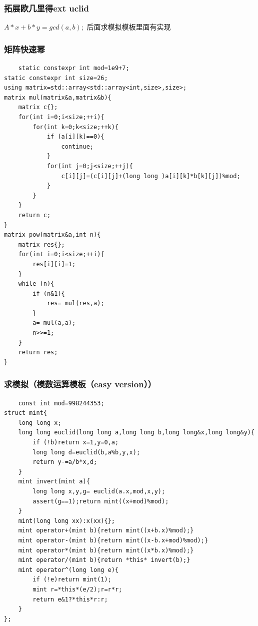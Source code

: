 \documentclass[UTF8,twoside]{ctexart}
\begin{document}
\subsubsection{拓展欧几里得ext uclid}
$A*x+b*y=gcd(a,b);$
后面求模拟模板里面有实现
\subsubsection{矩阵快速幂}
\begin{lstlisting}
    static constexpr int mod=1e9+7;
static constexpr int size=26;
using matrix=std::array<std::array<int,size>,size>;
matrix mul(matrix&a,matrix&b){
    matrix c{};
    for(int i=0;i<size;++i){
        for(int k=0;k<size;++k){
            if (a[i][k]==0){
                continue;
            }
            for(int j=0;j<size;++j){
                c[i][j]=(c[i][j]+(long long )a[i][k]*b[k][j])%mod;
            }
        }
    }
    return c;
}
matrix pow(matrix&a,int n){
    matrix res{};
    for(int i=0;i<size;++i){
        res[i][i]=1;
    }
    while (n){
        if (n&1){
            res= mul(res,a);
        }
        a= mul(a,a);
        n>>=1;
    }
    return res;
}
\end{lstlisting}
\subsubsection{求模拟（模数运算模板（easy version））}
\begin{lstlisting}
    const int mod=998244353;
struct mint{
    long long x;
    long long euclid(long long a,long long b,long long&x,long long&y){
        if (!b)return x=1,y=0,a;
        long long d=euclid(b,a%b,y,x);
        return y-=a/b*x,d;
    }
    mint invert(mint a){
        long long x,y,g= euclid(a.x,mod,x,y);
        assert(g==1);return mint((x+mod)%mod);
    }
    mint(long long xx):x(xx){};
    mint operator+(mint b){return mint((x+b.x)%mod);}
    mint operator-(mint b){return mint((x-b.x+mod)%mod);}
    mint operator*(mint b){return mint((x*b.x)%mod);}
    mint operator/(mint b){return *this* invert(b);}
    mint operator^(long long e){
        if (!e)return mint(1);
        mint r=*this*(e/2);r=r*r;
        return e&1?*this*r:r;
    }
};
\end{lstlisting}
\end{document}
